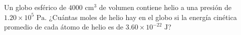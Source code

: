 \item Un globo esférico de $4000\text{ cm}^3$ de volumen contiene helio a una presión de $1.20 \times 10^5\text{ Pa}$. ¿Cuántas moles de helio hay en el globo si la energía cinética promedio de cada átomo de helio es de $3.60 \times 10^{-22}\text{ J}$?
